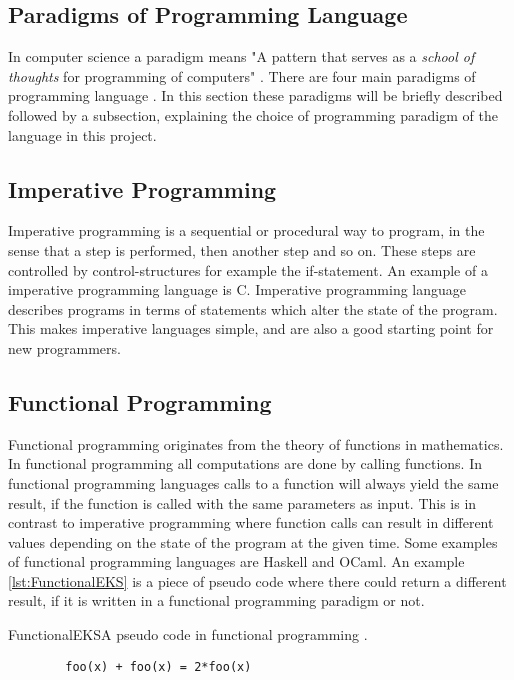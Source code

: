 \subsection{Paradigms of Programming Language}
In computer science %
a paradigm means "A pattern that serves as a \textit{school of thoughts} for programming of computers" \citep{ProgrammingParadigms2}. 
There are four main paradigms of programming language \citep{ProgrammingParadigms}. In this section these paradigms will be briefly described followed by a subsection, explaining the choice of programming paradigm of the language in this project.

\subsection{Imperative Programming}
Imperative programming is a sequential or procedural way to program, in the sense that a step is performed, then another step and so on. These steps are controlled by control-structures for example the if-statement. An example of a imperative programming language is C. Imperative programming language describes programs in terms of statements which alter the state of the program. This makes imperative languages simple, and are also a good starting point for new programmers.


\subsection{Functional Programming}
Functional programming originates from the theory of functions in mathematics. In functional programming all computations are done by calling functions. In functional programming languages calls to a function will always yield the same result, if the function is called with the same parameters as input. This is in contrast to imperative programming where function calls can result in different values depending on the state of the program at the given time. Some examples of functional programming languages are Haskell and OCaml. 
An example \ref{lst:FunctionalEKS} is a piece of pseudo code where there could return a different result, if it is written in a functional programming paradigm or not.

\begin{code}{FunctionalEKS}{A pseudo code in functional programming \citep{funcprog}.}
	\begin{lstlisting}
		foo(x) + foo(x) = 2*foo(x)
	\end{lstlisting}
\end{code}

